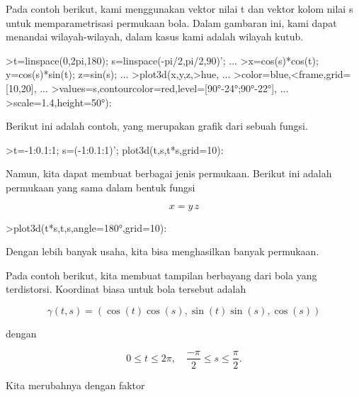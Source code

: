 \begin{eulercomment}
\begin{eulercomment}
Pada contoh berikut, kami menggunakan vektor nilai t dan vektor kolom
nilai s untuk memparametrisasi permukaan bola. Dalam gambaran ini,
kami dapat menandai wilayah-wilayah, dalam kasus kami adalah wilayah
kutub.
\end{eulercomment}
\begin{eulerprompt}
>t=linspace(0,2pi,180); s=linspace(-pi/2,pi/2,90)'; ...
>x=cos(s)*cos(t); y=cos(s)*sin(t); z=sin(s); ...
>plot3d(x,y,z,>hue, ...
>color=blue,<frame,grid=[10,20], ...
>values=s,contourcolor=red,level=[90°-24°;90°-22°], ...
>scale=1.4,height=50°):
\end{eulerprompt}
\begin{eulercomment}
Berikut ini adalah contoh, yang merupakan grafik dari sebuah fungsi.
\end{eulercomment}
\begin{eulerprompt}
>t=-1:0.1:1; s=(-1:0.1:1)'; plot3d(t,s,t*s,grid=10):
\end{eulerprompt}
\begin{eulercomment}
Namun, kita dapat membuat berbagai jenis permukaan. Berikut ini adalah
permukaan yang sama dalam bentuk fungsi

\end{eulercomment}
\begin{eulerformula}
\[
x = y \, z
\]
\end{eulerformula}
\begin{eulerprompt}
>plot3d(t*s,t,s,angle=180°,grid=10):
\end{eulerprompt}
\begin{eulercomment}
Dengan lebih banyak usaha, kita bisa menghasilkan banyak permukaan.

Pada contoh berikut, kita membuat tampilan berbayang dari bola yang
terdistorsi. Koordinat biasa untuk bola tersebut adalah

\end{eulercomment}
\begin{eulerformula}
\[
\gamma(t,s) = (\cos(t)\cos(s),\sin(t)\sin(s),\cos(s))
\]
\end{eulerformula}
\begin{eulercomment}
dengan

\end{eulercomment}
\begin{eulerformula}
\[
0 \le t \le 2\pi, \quad \frac{-\pi}{2} \le s \le \frac{\pi}{2}.
\]
\end{eulerformula}
\begin{eulercomment}
Kita merubahnya dengan faktor


\end{eulercomment}
\end{eulercomment}
